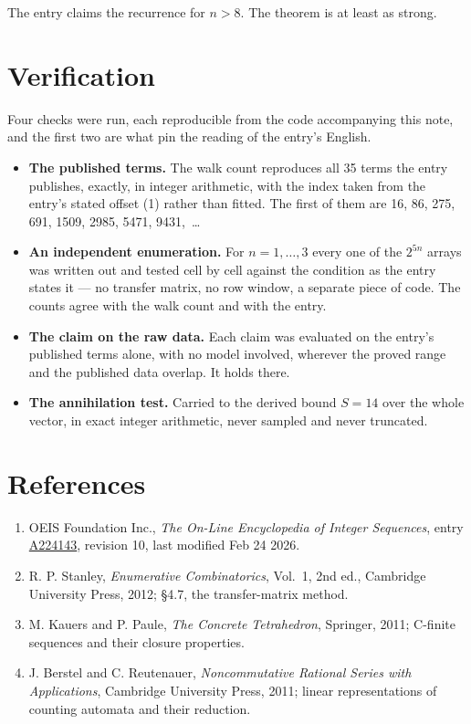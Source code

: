 \documentclass[11pt]{article}
\theoremstyle{definition}
\begin{document}
The entry claims the recurrence for $n > 8$. The theorem is at least as strong.

\section{Verification}

Four checks were run, each reproducible from the code accompanying this note, and the first two are what pin the reading of the entry's English.

\begin{itemize}

\item {\bfseries The published terms.} The walk count reproduces all 35 terms the entry publishes, exactly, in integer arithmetic, with the index taken from the entry's stated offset (1) rather than fitted. The first of them are 16, 86, 275, 691, 1509, 2985, 5471, 9431,~\dots

\item {\bfseries An independent enumeration.} For $n = 1,\dots,3$ every one of the $2^{5n}$ arrays was written out and tested cell by cell against the condition as the entry states it --- no transfer matrix, no row window, a separate piece of code. The counts agree with the walk count and with the entry.

\item {\bfseries The claim on the raw data.} Each claim was evaluated on the entry's published terms alone, with no model involved, wherever the proved range and the published data overlap. It holds there.

\item {\bfseries The annihilation test.} Carried to the derived bound $S = 14$ over the whole vector, in exact integer arithmetic, never sampled and never truncated.

\end{itemize}

\section{References}

\begin{enumerate}

\item OEIS Foundation Inc., \emph{The On-Line Encyclopedia of Integer Sequences}, entry \href{https://oeis.org/A224143}{A224143}, revision 10, last modified Feb 24 2026.

\item R. P. Stanley, \emph{Enumerative Combinatorics}, Vol.~1, 2nd ed., Cambridge University Press, 2012; \S4.7, the transfer-matrix method.

\item M. Kauers and P. Paule, \emph{The Concrete Tetrahedron}, Springer, 2011; C-finite sequences and their closure properties.

\item J. Berstel and C. Reutenauer, \emph{Noncommutative Rational Series with Applications}, Cambridge University Press, 2011; linear representations of counting automata and their reduction.

\end{enumerate}
\end{document}
